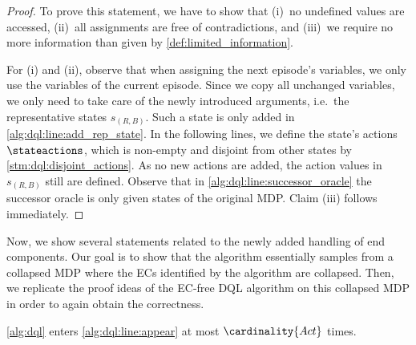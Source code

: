 \documentclass{theoretics}
\newcommand{\Actions}{Act}
\begin{document}
\begin{proof}
	To prove this statement, we have to show that (i)~no undefined values are accessed, (ii)~all assignments are free of contradictions, and (iii)~we require no more information than given by \cref{def:limited_information}.

	For (i) and (ii), observe that when assigning the next episode's variables, we only use the variables of the current episode.
	Since we copy all unchanged variables, we only need to take care of the newly introduced arguments, i.e.\ the representative states $s_{(R, B)}$.
	Such a state is only added in \cref{alg:dql:line:add_rep_state}.
	In the following lines, we define the state's actions $\stateactions$, which is non-empty and disjoint from other states by \cref{stm:dql:disjoint_actions}.
	As no new actions are added, the action values in $s_{(R,B)}$ still are defined.
	Observe that in \cref{alg:dql:line:successor_oracle} the successor oracle is only given states of the original MDP.
	Claim (iii) follows immediately. 
\end{proof}
Now, we show several statements related to the newly added handling of end components.
Our goal is to show that the algorithm essentially samples from a collapsed MDP where the ECs identified by the algorithm are collapsed.
Then, we replicate the proof ideas of the EC-free DQL algorithm on this collapsed MDP in order to again obtain the correctness.
\begin{lemma} \label{stm:dql:finite_representative_states}
	\cref{alg:dql} enters \cref{alg:dql:line:appear} at most $\cardinality{\Actions}$ times.
\end{lemma}
\end{document}
